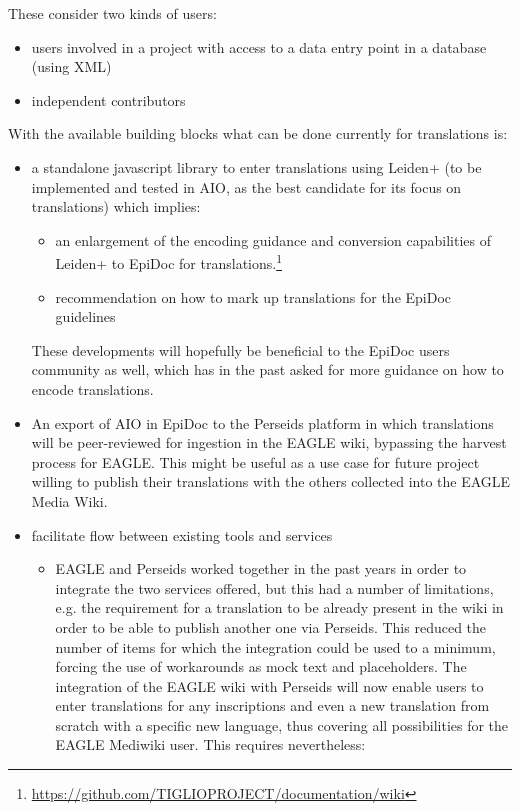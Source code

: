 \documentclass[amsthm,ebook]{saparticle}
\begin{document}
These consider two kinds of users: 
\begin{itemize}
\item users involved in a project with access to a data entry point in a database (using XML)
\item independent contributors 
\end{itemize}

With the available building blocks what can be done currently for translations is:
\begin{itemize}
\item a standalone javascript library to enter translations using Leiden+ (to be implemented and tested in AIO, as the best candidate for its focus on translations) which implies:
	\begin{itemize}
	\item an enlargement of the encoding guidance and conversion capabilities of Leiden+ to EpiDoc for translations.\footnote{\url{https://github.com/TIGLIOPROJECT/documentation/wiki}}
	\item recommendation on how to mark up translations for the EpiDoc guidelines
	\end{itemize}
	These developments will hopefully be beneficial to the EpiDoc users community as well, which has in the past asked for more guidance on how to encode translations. 
\item An export of AIO in EpiDoc to the Perseids platform in which translations will be peer-reviewed for ingestion in the EAGLE wiki, bypassing the harvest process for EAGLE. This might be useful as a use case for future project willing to publish their translations with the others collected into the EAGLE Media Wiki.
\item facilitate flow between existing tools and services 
	\begin{itemize}
	\item EAGLE and Perseids worked together in the past years in order to integrate the two services offered, but this had a number of limitations, e.g. the requirement for a translation to be already present in the wiki in order to be able to publish another one via Perseids. This reduced the number of items for which the integration could be used to a minimum, forcing the use of workarounds as mock text and placeholders. The integration of the EAGLE wiki with Perseids will now enable users to enter translations for any inscriptions and even a new translation from scratch with a specific new language, thus covering all possibilities for the EAGLE Mediwiki user. This requires nevertheless:

\end{itemize}
\end{itemize}
\end{document}
